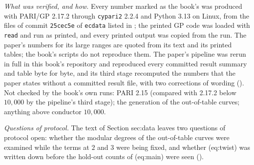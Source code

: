 \begin{sloppypar}
\emph{What was verified, and how.} Every number marked as the book's was produced with PARI/GP 2.17.2 through \texttt{cypari2} 2.2.4 and Python 3.13 on
Linux, from the files of commit \texttt{25cec5e} of \texttt{ecdata} listed in ; the printed GP code was loaded with
\texttt{read} and run as printed, and every printed output was copied from the run. The paper's numbers for its large ranges are quoted from its text
and its printed tables; the book's scripts do not reproduce them. The paper's pipeline was rerun in full in this book's repository and reproduced every
committed result summary and table byte for byte, and its third stage recomputed the numbers that the paper states without a committed result file, with
two corrections of wording (). Not checked by the book's own runs: PARI 2.15 (compared with 2.17.2 below
$10{,}000$ by the pipeline's third stage); the generation of the out-of-table curves; anything above conductor $10{,}000$.

\emph{Questions of protocol.} The text of Section sec:data leaves two questions of protocol open: whether the modular degrees of the out-of-table
curves were examined while the terms at $2$ and $3$ were being fixed, and whether (eq:twist) was written down before the hold-out counts of (eq:main) were
seen ().
\end{sloppypar}
